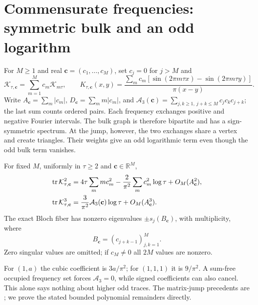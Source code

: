 \section{Commensurate frequencies: symmetric bulk and an odd logarithm}
\label{sec:commensurate-family}
For $M\ge1$ and real $\mathbf c=(c_1,\ldots,c_M)$, set $c_j=0$ for $j>M$ and
\begin{equation}\label{mf:eq:operator}
 \mathcal K_{\tau,\mathbf c}=\sum_{m=1}^M c_m\mathcal K_{m\tau},\qquad
 K_{\tau,\mathbf c}(x,y)=
 \frac{\sum_m c_m[\sin(2\pi m\tau x)-\sin(2\pi m\tau y)]}{\pi(x-y)}.
\end{equation}
Write $A_{\mathbf c}=\sum_m|c_m|$, $D_{\mathbf c}=\sum_m m|c_m|$, and
$\mathcal A_3(\mathbf c)=\sum_{j,k\ge1,\ j+k\le M}c_jc_kc_{j+k}$;
the last sum counts ordered pairs. Each frequency exchanges positive and
negative Fourier intervals. The bulk graph is therefore bipartite and
has a sign-symmetric spectrum. At the jump, however, the two exchanges
share a vertex and create triangles. Their weights give an odd logarithmic
term even though the odd bulk term vanishes.

\begin{theorem}\label{mf:thm:moments}
For fixed $M$, uniformly in $\tau\ge2$ and $\mathbf c\in\mathbb R^M$,
\begin{align}
 \operatorname{tr}\mathcal K_{\tau,\mathbf c}^2
 &=4\tau\sum_m m c_m^2-\frac2{\pi^2}\sum_m c_m^2\log\tau
       +O_M(A_{\mathbf c}^2),\label{mf:eq:quadratic}\\
 \operatorname{tr}\mathcal K_{\tau,\mathbf c}^3
 &=\frac3{\pi^2}\mathcal A_3(\mathbf c)\log\tau
       +O_M(A_{\mathbf c}^3).\label{mf:eq:cubic}
\end{align}
The exact Bloch fiber has nonzero eigenvalues $\pm s_j(B_{\mathbf c})$,
with multiplicity, where
\begin{equation}\label{mf:eq:hankel}
 B_{\mathbf c}=(c_{j+k-1})_{j,k=1}^M.
\end{equation}
Zero singular values are omitted; if $c_M\ne0$ all $2M$ values are nonzero.
\end{theorem}
For $(1,a)$ the cubic coefficient is $3a/\pi^2$; for $(1,1,1)$ it is
$9/\pi^2$. A sum-free occupied frequency set forces $\mathcal A_3=0$,
while signed coefficients can also cancel. This alone says nothing about
higher odd traces. The matrix-jump precedents are
\cite{BollmannMueller2024,BasorEhrhardtVirtanen2024}; we prove the stated
bounded polynomial remainders directly.

